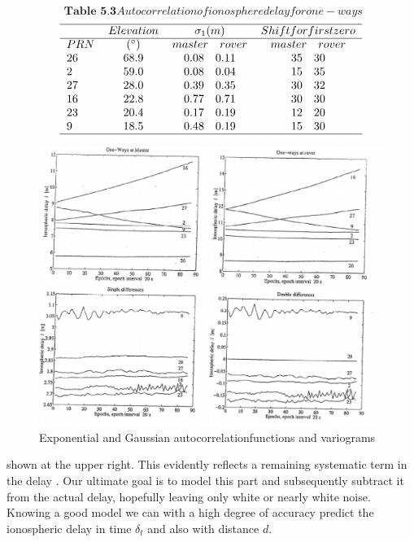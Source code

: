  \[\textbf{ Table 5.3} Autocorrelation of ionospheredelay for one-ways \] 
 \[ \begin{tabular}{lccc}
 \hline
 $ \quad$ & $ Elevation  $ & $\sigma_{1}(m)$&$Shift for firstzero  $ \\
 \cline{1-4}
  $ PRN$ & $ (^{\circ}) $ & $ master \quad rover $&$master \quad rover  $ \\
   $ 26$ & $ 68.9 $ & $ 0.08 \quad0.11 $&$35\quad 30  $ \\
  $ 2$ & $ 59.0 $ & $ 0.08 \quad0.04 $&$15\quad 35  $ \\
  $ 27$ & $ 28.0 $ & $ 0.39 \quad0.35 $&$30\quad 32  $ \\
  $ 16$ & $ 22.8 $ & $ 0.77 \quad0.71 $&$30\quad 30  $ \\
  $ 23$ & $ 20.4 $ & $ 0.17 \quad0.19 $&$12\quad 20  $ \\
  $ 9$ & $ 18.5 $ & $ 0.48 \quad0.19 $&$15\quad 30  $ \\
  
 \hline
 \end{tabular} \] 
      	  
  \begin{figure}[h]
  	\centering
  	\includegraphics[width=0.7\linewidth]{TeX_files/Part02/chapter05/image/7}
  	\caption{Exponential and Gaussian autocorrelationfunctions and variograms}
  	\label{}
  \end{figure}
  
 shown at the upper right. This evidently reflects a remaining systematic term in the delay . Our ultimate goal is to model this part and subsequently subtract it from the actual delay, hopefully leaving only white or nearly white noise. Knowing a good model we can with a high degree of accuracy predict the ionospheric delay in time $ \delta_{t} $ and also with distance $ d $. 
  
